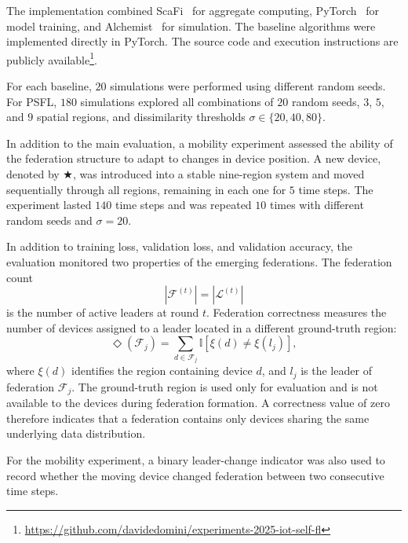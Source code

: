 The implementation combined ScaFi~\cite{DBLP:journals/softx/CasadeiVAP22}
for aggregate computing, PyTorch~\cite{paszke2017automatic} for model training,
and Alchemist~\cite{DBLP:journals/jos/PianiniMV13} for simulation.
%
The baseline algorithms were implemented directly in PyTorch.
%
The source code and execution instructions are publicly
available\footnote{\url{https://github.com/davidedomini/experiments-2025-iot-self-fl}}.

For each baseline, \(20\) simulations were performed using different random
seeds.
%
For \gls{PSFL}, \(180\) simulations explored all combinations of
\(20\) random seeds, \(3\), \(5\), and \(9\) spatial regions, and dissimilarity
thresholds \(\sigma\in\{20,40,80\}\).

In addition to the main evaluation, a mobility experiment assessed the ability
of the federation structure to adapt to changes in device position.
%
A new device, denoted by \(\bigstar\), was introduced into a stable
nine-region system and moved sequentially through all regions, remaining in each
one for \(5\) time steps.
%
The experiment lasted \(140\) time steps and was repeated \(10\) times with
different random seeds and \(\sigma=20\).

In addition to training loss, validation loss, and validation accuracy, the
evaluation monitored two properties of the emerging federations.
%
The federation count
%
\begin{equation}
  |\mathcal{F}^{(t)}|
  =
  |\mathcal{L}^{(t)}|
  \label{eq:psfl-federation-count}
\end{equation}
%
is the number of active leaders at round \(t\).
%
Federation correctness measures the number of devices assigned to a leader
located in a different ground-truth region:
%
\begin{equation}
  \Diamond(\mathcal{F}_j)
  =
  \sum_{d\in\mathcal{F}_j}
  \mathbb{I}
  \left[
    \xi(d)\neq\xi(l_j)
  \right],
  \label{eq:psfl-federation-correctness}
\end{equation}
%
where \(\xi(d)\) identifies the region containing device \(d\), and \(l_j\) is
the leader of federation \(\mathcal{F}_j\).
%
The ground-truth region is used only for evaluation and is not available to the
devices during federation formation.
%
A correctness value of zero therefore indicates that a federation contains
only devices sharing the same underlying data distribution.

For the mobility experiment, a binary leader-change indicator was also used to
record whether the moving device changed federation between two consecutive
time steps.


